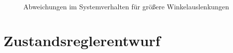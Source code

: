 \documentclass[
	pagesize,
	fontsize=12pt,
	paper=a4,
	oneside,
   reqno
]{scrartcl}
\begin{document}
\begin{figure}[H]
    \centering
    \caption[Vergleich der beiden Winkelverläufe in Grad mit Abweichung]{Abweichungen im Systemverhalten für größere Winkelauslenkungen}
    \label{fig:Bild6}
\end{figure}

\clearpage

\section{Zustandsreglerentwurf}
\end{document}

